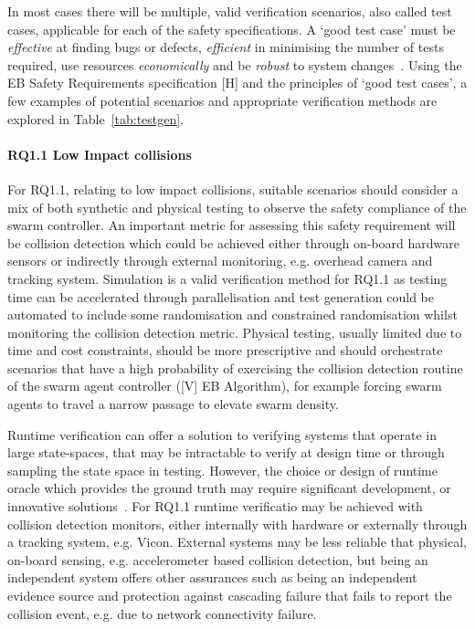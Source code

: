 \documentclass[lettersize,journal]{IEEEtran}
\begin{document}
In most cases there will be multiple, valid verification scenarios, also called test cases, applicable for each of the safety specifications. A `good test case' must be \emph{effective} at finding bugs or defects, \emph{efficient} in minimising the number of tests required, use resources \emph{economically} and be \emph{robust} to system changes~\cite{Fewster1999}. Using the EB Safety Requirements specification [H] and the principles of `good test cases', a few examples of potential scenarios and appropriate verification methods are explored in Table~\ref{tab:testgen}. 


\paragraph*{RQ1.1 Low Impact collisions}

For RQ1.1, relating to low impact collisions, suitable scenarios should consider a mix of both synthetic and physical testing to observe the safety compliance of the swarm controller. An important metric for assessing this safety requirement will be collision detection which could be achieved either through on-board hardware sensors or indirectly through external monitoring, e.g. overhead camera and tracking system. Simulation is a valid verification method for RQ1.1 as testing time can be accelerated through parallelisation and test generation could be automated to include some randomisation and constrained randomisation whilst monitoring the collision detection metric. Physical testing, usually limited due to time and cost constraints, should be more prescriptive and should orchestrate scenarios that have a high probability of exercising the collision detection routine of the swarm agent controller ([V] EB Algorithm), for example forcing swarm agents to travel a narrow passage to elevate swarm density. 

Runtime verification can offer a solution to verifying systems that operate in large state-spaces, that may be intractable to verify at design time or through sampling the state space in testing. However, the choice or design of runtime oracle which provides the ground truth may require significant development, or innovative solutions~\cite{maple2020cyres}. For RQ1.1 runtime verificatio may be achieved with collision detection monitors, either internally with hardware or externally through a tracking system, e.g. Vicon. External systems may be less reliable that physical, on-board sensing, e.g. accelerometer based collision detection, but being an independent system offers other assurances such as being an independent evidence source and protection against cascading failure that fails to report the collision event, e.g. due to network connectivity failure.
\end{document}
